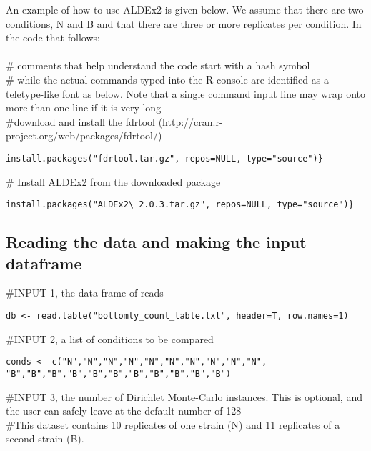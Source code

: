 \documentclass[11pt]{amsart}
\begin{document}
An example of how to use ALDEx2 is given below. We assume that there are two conditions, N and B and that there are three or more replicates per condition. In the code that follows:
\\\\
\noindent \#  comments that help understand the code start with a hash symbol\\

\noindent \# while the actual commands typed into the R console are identified as a teletype-like font as below. Note that a single command input line may wrap onto more than one line if it is very long\\

\noindent \#download and install the fdrtool (http://cran.r-project.org/web/packages/fdrtool/)\\
\begin{verbatim}install.packages("fdrtool.tar.gz", repos=NULL, type="source")}
\end{verbatim}

\noindent \#  Install ALDEx2 from the downloaded package\\
\begin{verbatim}install.packages("ALDEx2\_2.0.3.tar.gz", repos=NULL, type="source")}
\end{verbatim}

\subsection{Reading the data and making the input dataframe}

\noindent\#INPUT 1, the data frame of reads\\
\begin{verbatim}db <- read.table("bottomly_count_table.txt", header=T, row.names=1)\end{verbatim}

\noindent\#INPUT 2, a list of conditions to be compared\\
\begin{verbatim}conds <- c("N","N","N","N","N","N","N","N","N","N",
"B","B","B","B","B","B","B","B","B","B","B")
\end{verbatim}

\noindent\#INPUT 3, the number of Dirichlet Monte-Carlo instances. This is optional, and the user can safely leave at the default number of 128\\

\noindent\#This dataset contains 10 replicates of one strain (N) and 11 replicates of a second strain (B).\\
\end{document}
